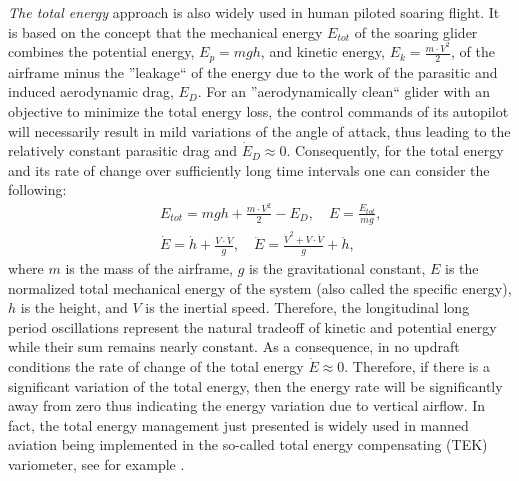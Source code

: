 \documentclass{ifacconf}
\begin{document}
\emph{The total energy} approach is also widely used in human piloted soaring
flight. It is based on the concept that the mechanical energy $E_{tot}$ of
the soaring glider combines the potential energy, $E_p=mgh$, and kinetic
energy, $E_k=\frac{m\cdot V^2}{2}$, of the airframe minus the ''leakage`` of
the energy due to the work of the parasitic and induced aerodynamic drag,
$E_{D}$. For an ''aerodynamically clean`` glider with an objective to
minimize the total energy loss, the control commands of its autopilot will
necessarily result in mild variations of the angle of attack, thus leading to
the relatively constant parasitic drag and $\dot{E}_{D}\approx0$.
Consequently, for the total energy and its rate of change over sufficiently
long time intervals one can consider the following:
\begin{eqnarray}
    && E_{tot}=mgh+\frac{m\cdot V^2}{2}-E_{D}, \quad E=\frac{E_{tot}}{mg}, \nonumber \\
    && \dot{E}=\dot{h}+\frac{V \cdot \dot{V}}{g}, \quad \ddot{E}=\frac{\dot{V}^2 + V \cdot
    \ddot{V}}{g} + \ddot{h},
    \label{eq:totenergyrate}
\end{eqnarray}
where $m$ is the mass of the airframe, $g$ is the gravitational constant, $E$
is the normalized total mechanical energy of the system (also called the
specific energy), $h$ is the height, and $V$ is the inertial speed.
Therefore, the longitudinal long period oscillations represent the natural
tradeoff of kinetic and potential energy while their sum remains nearly
constant. As a consequence, in no updraft conditions the rate of change of
the total energy $\dot{E}\approx 0$. Therefore, if there is a significant
variation of the total energy, then the energy rate will be significantly
away from zero thus indicating the energy variation due to vertical airflow.
In fact, the total energy management just presented is widely used in manned
aviation being implemented in the so-called total energy compensating (TEK)
variometer, see for example \cite{PitLab:2013:Online}.
\end{document}

